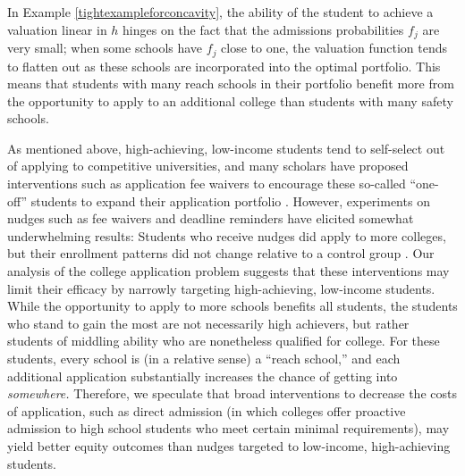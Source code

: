 In Example \ref{tightexampleforconcavity}, the ability of the student to achieve a valuation linear in $h$ hinges on the fact that the admissions probabilities $f_j$ are very small; when some schools have $f_j$ close to one, the valuation function tends to flatten out as these schools are incorporated into the optimal portfolio. This means that students with many reach schools in their portfolio benefit more from the opportunity to apply to an additional college than students with many safety schools.

As mentioned above, high-achieving, low-income students tend to self-select out of applying to competitive universities, and many scholars have proposed interventions such as application fee waivers to encourage these so-called  ``one-off'' students to expand their application portfolio \cite{hoxbyandavery2012,hoxbyandturner2013}. However, experiments on nudges such as fee waivers and deadline reminders have elicited somewhat underwhelming results: Students who receive nudges did apply to more colleges, but their enrollment patterns did not change relative to a control group \cite{gurantzetal2021}. Our analysis of the college application problem suggests that these interventions may limit their efficacy by narrowly targeting high-achieving, low-income students. While the opportunity to apply to more schools benefits all students, the students who stand to gain the most are not necessarily high achievers, but rather students of middling ability who are nonetheless qualified for college. For these students, every school is (in a relative sense) a ``reach school,'' and each additional application substantially increases the chance of getting into \emph{somewhere.} Therefore, we speculate that broad interventions to decrease the costs of application, such as direct admission \cite{jaschik2022} (in which colleges offer proactive admission to high school students who meet certain minimal requirements), may yield better equity outcomes than nudges targeted to low-income, high-achieving students.

